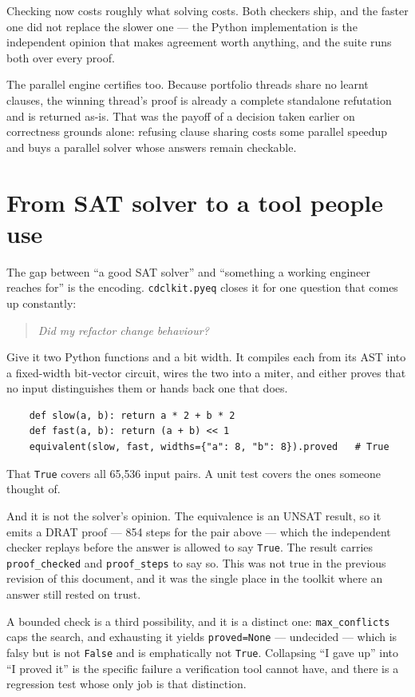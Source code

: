 \documentclass[11pt,a4paper]{article}
\begin{document}
Checking now costs roughly what solving costs. Both checkers ship, and the
faster one did not replace the slower one --- the Python implementation is the
independent opinion that makes agreement worth anything, and the suite runs
both over every proof.

The parallel engine certifies too. Because portfolio threads share no learnt
clauses, the winning thread's proof is already a complete standalone refutation
and is returned as-is. That was the payoff of a decision taken earlier on
correctness grounds alone: refusing clause sharing costs some parallel speedup
and buys a parallel solver whose answers remain checkable.

\section{From SAT solver to a tool people use}
\label{sec:pyeq}

The gap between ``a good SAT solver'' and ``something a working engineer
reaches for'' is the encoding. \texttt{cdclkit.pyeq} closes it for one question
that comes up constantly:

\begin{quote}
\emph{Did my refactor change behaviour?}
\end{quote}

Give it two Python functions and a bit width. It compiles each from its AST
into a fixed-width bit-vector circuit, wires the two into a miter, and either
proves that no input distinguishes them or hands back one that does.

\begin{verbatim}
    def slow(a, b): return a * 2 + b * 2
    def fast(a, b): return (a + b) << 1
    equivalent(slow, fast, widths={"a": 8, "b": 8}).proved   # True
\end{verbatim}

\noindent
That \texttt{True} covers all 65{,}536 input pairs. A unit test covers the ones
someone thought of.

And it is not the solver's opinion. The equivalence is an UNSAT result, so it
emits a DRAT proof --- 854 steps for the pair above --- which the independent
checker replays before the answer is allowed to say \texttt{True}. The result
carries \texttt{proof\_checked} and \texttt{proof\_steps} to say so. This was
not true in the previous revision of this document, and it was the single place
in the toolkit where an answer still rested on trust.

A bounded check is a third possibility, and it is a distinct one:
\texttt{max\_conflicts} caps the search, and exhausting it yields
\texttt{proved=None} --- undecided --- which is falsy but is not \texttt{False}
and is emphatically not \texttt{True}. Collapsing ``I gave up'' into ``I proved
it'' is the specific failure a verification tool cannot have, and there is a
regression test whose only job is that distinction.
\end{document}
